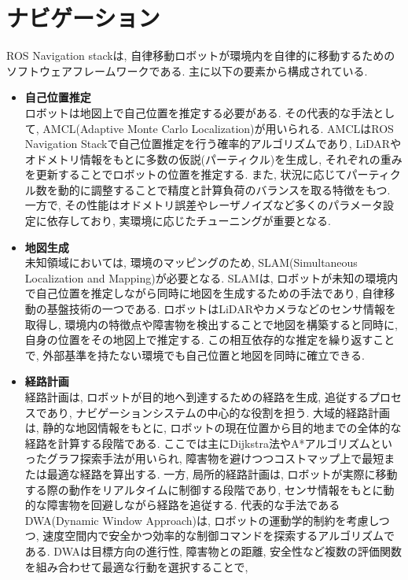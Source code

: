\section{ナビゲーション}
ROS Navigation stack\cite{navstack}は, 自律移動ロボットが環境内を自律的に移動するためのソフトウェアフレームワークである. 主に以下の要素から構成されている. 
\begin{itemize}
     \item \textbf{自己位置推定}\\
     ロボットは地図上で自己位置を推定する必要がある. その代表的な手法として, AMCL(Adaptive Monte Carlo Localization)が用いられる. 
     AMCLはROS Navigation Stackで自己位置推定を行う確率的アルゴリズムであり, LiDARやオドメトリ情報をもとに多数の仮説(パーティクル)を生成し, 
     それぞれの重みを更新することでロボットの位置を推定する. また, 状況に応じてパーティクル数を動的に調整することで精度と計算負荷のバランスを取る特徴をもつ. 
     一方で, その性能はオドメトリ誤差やレーザノイズなど多くのパラメータ設定に依存しており, 実環境に応じたチューニングが重要となる. 
     \item \textbf{地図生成}\\
     未知領域においては, 環境のマッピングのため, SLAM(Simultaneous Localization and Mapping)が必要となる. 
     SLAMは, ロボットが未知の環境内で自己位置を推定しながら同時に地図を生成するための手法であり, 
     自律移動の基盤技術の一つである. ロボットはLiDARやカメラなどのセンサ情報を取得し, 環境内の特徴点や障害物を検出することで地図を構築すると同時に, 
     自身の位置をその地図上で推定する. この相互依存的な推定を繰り返すことで, 外部基準を持たない環境でも自己位置と地図を同時に確立できる. 
     \item \textbf{経路計画}\\
     経路計画は, ロボットが目的地へ到達するための経路を生成, 追従するプロセスであり, ナビゲーションシステムの中心的な役割を担う. 
     大域的経路計画は, 静的な地図情報をもとに, ロボットの現在位置から目的地までの全体的な経路を計算する段階である. 
     ここでは主にDijkstra法やA*アルゴリズムといったグラフ探索手法が用いられ, 障害物を避けつつコストマップ上で最短または最適な経路を算出する. 
     一方, 局所的経路計画は, ロボットが実際に移動する際の動作をリアルタイムに制御する段階であり, 
     センサ情報をもとに動的な障害物を回避しながら経路を追従する. 
     代表的な手法であるDWA(Dynamic Window Approach)は, ロボットの運動学的制約を考慮しつつ, 
     速度空間内で安全かつ効率的な制御コマンドを探索するアルゴリズムである. 
     DWAは目標方向の進行性, 障害物との距離, 安全性など複数の評価関数を組み合わせて最適な行動を選択することで, 

\end{itemize}

